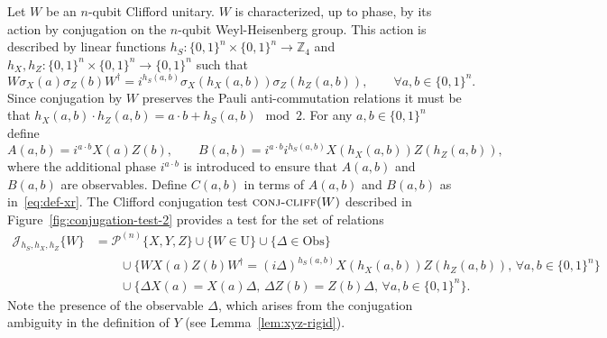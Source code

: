 \documentclass[11pt]{article}
\theoremstyle{remark}
\theoremstyle{definition}
\newcommand{\Z}{\ensuremath{\mathbb{Z}}}
\newcommand{\setft}[1]{\mathrm{#1}}
\newcommand{\Obs}{\setft{Obs}}
\newcommand{\Unitary}{\setft{U}}
\newcommand{\conjc}{\textsc{conj-cliff}}
\newcommand{\conjr}{\mathcal{J}\!}
\newcommand{\paulin}{\mathcal{P}^{(n)}\!}
\begin{document}
Let $W$ be an $n$-qubit Clifford unitary. $W$ is characterized, up to phase, by its action by conjugation on the $n$-qubit Weyl-Heisenberg group. This action is described  by linear functions $h_S:\{0,1\}^n\times\{0,1\}^n \to \Z_4$ and $h_X,h_Z:\{0,1\}^n\times\{0,1\}^n \to \{0,1\}^n$ such that
\begin{equation}\label{eq:conj-cliff}
W \sigma_X(a)\sigma_Z(b) W^\dagger = i^{h_S(a,b)}\sigma_X(h_X(a,b))\sigma_Z(h_Z(a,b)),\qquad\forall a,b\in\{0,1\}^n.
\end{equation}
Since conjugation by $W$ preserves the Pauli anti-commutation relations it must be that $h_X(a,b)\cdot h_Z(a,b) = a\cdot b+h_S(a,b)\mod 2$.
 For any $a,b\in\{0,1\}^n$ define
\begin{equation}\label{eq:def-control-c}
A(a,b) = i^{a\cdot b}X(a)Z(b), \qquad B(a,b) = i^{a\cdot b}i^{h_S(a,b)}X(h_X(a,b))Z(h_Z(a,b)),
\end{equation}
where the additional phase $i^{a\cdot b}$ is introduced to ensure that $A(a,b)$ and $B(a,b)$ are observables. Define $C(a,b)$ in terms of $A(a,b)$ and $B(a,b)$ as in~\eqref{eq:def-xr}. 
The Clifford conjugation test $\conjc(W)$ described in Figure~\ref{fig:conjugation-test-2} provides a test for the set of relations 
\begin{align*}
\conjr_{h_S,h_X,h_Z}\{W\} &= \paulin\{X,Y,Z\}  \cup \{W\in \Unitary\} \cup \{\Delta\in\Obs\}\\
&\qquad \cup \big\{ W X(a)Z(b)W^\dagger = (i\Delta)^{h_S(a,b)}X(h_X(a,b))Z(h_Z(a,b)),\,\forall a,b\in\{0,1\}^n\big\} \\
&\qquad \cup \big\{ \Delta X(a) = X(a)\Delta,\,\Delta Z(b)=Z(b)\Delta,\,\forall a,b\in\{0,1\}^n\big\}.
\end{align*}
Note the presence of the observable $\Delta$, which arises from the conjugation ambiguity in the definition of $Y$ (see Lemma~\ref{lem:xyz-rigid}). 
 
\end{document}
